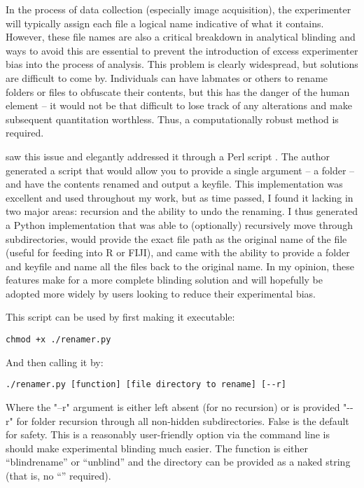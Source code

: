 In the process of data collection (especially image acquisition), the experimenter will typically assign each file a logical name indicative of what it contains. However, these file names are also a critical breakdown in analytical blinding and ways to avoid this are essential to prevent the introduction of excess experimenter bias into the process of analysis. This problem is clearly widespread, but solutions are difficult to come by. Individuals can have labmates or others to rename folders or files to obfuscate their contents, but this has the danger of the human element -- it would not be that difficult to lose track of any alterations and make subsequent quantitation worthless. Thus, a computationally robust method is required. 

\citet{Salter2016} saw this issue and elegantly addressed it through a Perl script \citep{Wall2000}. The author generated a script that would allow you to provide a single argument -- a folder -- and have the contents renamed and output a keyfile. This implementation was excellent and used throughout my work, but as time passed, I found it lacking in two major areas: recursion and the ability to undo the renaming. I thus generated a Python implementation that was able to (optionally) recursively move through subdirectories, would provide the exact file path as the original name of the file (useful for feeding into R or FIJI), and came with the ability to provide a folder and keyfile and name all the files back to the original name. In my opinion, these features make for a more complete blinding solution and will hopefully be adopted more widely by users looking to reduce their experimental bias.

This script can be used by first making it executable:

\begin{code}
\begin{verbatim}
chmod +x ./renamer.py
\end{verbatim}
\end{code}

And then calling it by:

\begin{code}
\begin{verbatim}
./renamer.py [function] [file directory to rename] [--r]
\end{verbatim}
\end{code}

Where the "--r" argument is either left absent (for no recursion) or is provided "\hyp{}\hyp{}r" for folder recursion through all non-hidden subdirectories. False is the default for safety. This is a reasonably user-friendly option via the command line is should make experimental blinding much easier. The function is either ``blindrename'' or ``unblind'' and the directory can be provided as a naked string (that is, no ``'' required).

